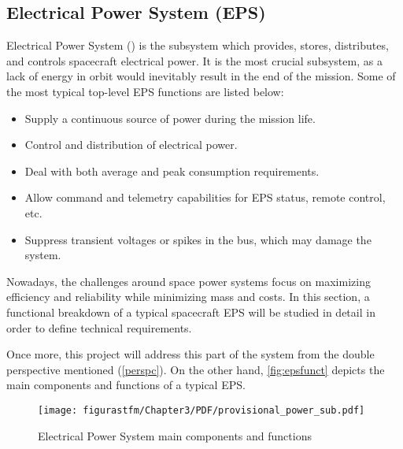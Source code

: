 \subsection{Electrical Power System (EPS)} \label{sec:EPS}

Electrical Power System () is the subsystem which provides, stores, distributes, and controls spacecraft electrical power. It is the most crucial subsystem, as a lack of energy in orbit would inevitably result in the end of the mission. Some of the most typical top-level \acrshort{EPS} functions are listed below:

\begin{itemize}  [noitemsep,topsep=0pt]

	\item{Supply a continuous source of power during the mission life.} \\
	\item{Control and distribution of electrical power.} \\
	\item{Deal with both average and peak consumption requirements.} \\
	\item{Allow command and telemetry capabilities for \acrshort{EPS} status, remote control, etc.} \\
	\item{Suppress transient voltages or spikes in the bus, which may damage the system.} \\


\end{itemize}

Nowadays, the challenges around space power systems focus on maximizing efficiency and reliability while minimizing mass and costs. In this section, a functional breakdown of a typical spacecraft \acrshort{EPS} will be studied in detail in order to define technical requirements.

Once more, this project will address this part of the system from the double perspective mentioned (\autoref{perspc}). On the other hand, \autoref{fig:epsfunct} depicts the main components and functions of a typical \acrshort{EPS}.

			\begin{figure}[H] 
				\centering
				\texttt{[image: figurastfm/Chapter3/PDF/provisional\_power\_sub.pdf]}
				\caption{Electrical Power System main components and functions}      		
				\label{fig:epsfunct}
  		\end{figure}

